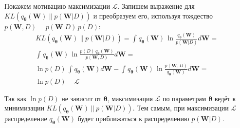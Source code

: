\documentclass{article}
\numberwithin{equation}{section}
\begin{document}
    Покажем мотивацию максимизации $\mathcal{L}$.
    Запишем выражение для
    $
    KL(
        q_{\pmb{\theta}}(\pmb{W})
        \parallel
        p(\pmb{W}| D)
    )
    $
    и преобразуем его, используя тождество $p(\pmb{W}, D) = p(\pmb{W}| D) \, p(D)$:
    \begin{equation}
    \begin{split}
        KL(
            q_{\pmb{\theta}}(\pmb{W})
            \parallel
            p(\pmb{W}| D)
        )
        =
            \int_{}{
                q_{\pmb{\theta}}(\pmb{W})
                \,
                \ln{
                    \frac
                        {
                            q_{\pmb{\theta}}(\pmb{W})
                        }
                        {p(\pmb{W} | D)}
                }
                d\pmb{W}
            }
        = \\
            \int_{}{
                q_{\pmb{\theta}}(\pmb{W})
                \,
                \ln{
                    \frac
                        {
                            p(D)
                            \,
                            q_{\pmb{\theta}}(\pmb{W})
                        }
                        {p(\pmb{W}, D)}
                }
                d\pmb{W}
            }
        = \\
            \ln{p(D)}
            \,
            \int_{}{
                q_{\pmb{\theta}}(\pmb{W}) d\pmb{W}
            }
            -
            \int_{}{
                q_{\pmb{\theta}}(\pmb{W})
                \,
                \ln{
                    \frac
                        {p(\pmb{W}, D)}
                        {q_{\pmb{\theta}}(\pmb{W})}
                }
                d\pmb{W}
            }
        = \\
            \ln{p(D)} - \mathcal{L}
    \end{split}
    \end{equation}

    Так как $\ln{p(D)}$ не зависит от $\pmb{\theta}$,
    максимизация $\mathcal{L}$ по параметрам $\pmb{\theta}$
    ведёт к минимизации
    $KL(q_{\pmb{\theta}}(\pmb{W})~||~p(\pmb{W}| D))$.
    Тем самым, при максимизации $\mathcal{L}$
    распределение $q_{\pmb{\theta}}(\pmb{W})$
    будет приближаться к распределению $p(\pmb{W}| D)$.
\end{document}
